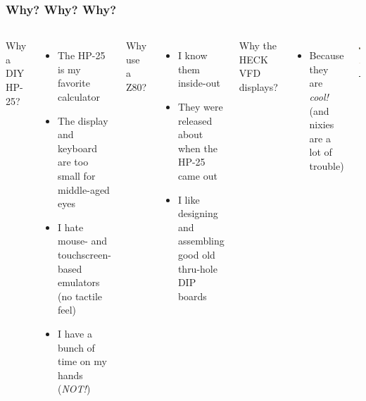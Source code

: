 \documentclass{beamer}
\newcommand{\tblue}[1]{\textcolor{my-blue}{#1}}
\begin{document}
\begin{frame}
  \frametitle{Why? Why? Why?}

  \begin{columns}
  \tblue{Why a DIY HP-25?}

    \begin{itemize}
    \scriptsize
    \item The HP-25 is my favorite calculator
    \item The display and keyboard are too small for middle-aged eyes
    \item I hate mouse- and touchscreen-based emulators \\ (no tactile feel)
    \item I have a bunch of time on my hands ({\em NOT!})
    \end{itemize}
    \vskip 0.1in
  
    \tblue{Why use a Z80?}
  
    \begin{itemize}
    \scriptsize
    \item I know them inside-out
    \item They were released about when the HP-25 came out
    \item I like designing and assembling good old thru-hole DIP boards
    \end{itemize}
    \vskip 0.1in
  
    \tblue{Why the HECK VFD displays?}
    \begin{itemize}
    \scriptsize
    \item Because they are {\em cool!} \\
     (and nixies are a lot of trouble)
    \end{itemize}


    \includegraphics[width=0.7in]{figs/hp-25.jpg}
    \vskip 0.1in
    \includegraphics[width=1in]{figs/z80.jpg}
    \vskip 0.3in
    \includegraphics[width=1in]{figs/vfd.png}

  \end{columns}
\end{frame}
\end{document}
